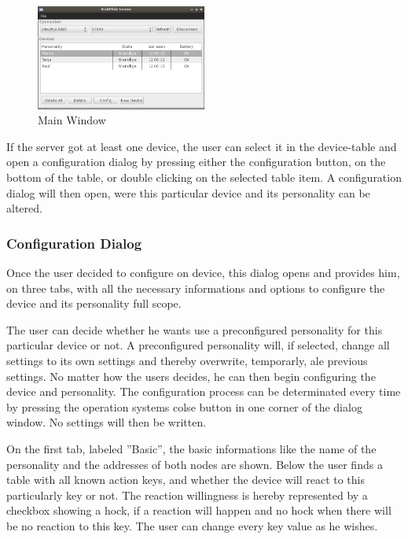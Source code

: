 \begin{figure}[h!]
 \centering
 \includegraphics[width= 0.5\textwidth, clip=true  ,keepaspectratio=true]{./pic/java-server-main.png}
 \caption{Main Window}
 \label{java-server-main}
\end{figure}



If the server got at least one device, the user can select it in the device-table and open a configuration dialog by pressing either the configuration button, on the bottom of the table, or double clicking on the selected table item. A configuration dialog will then open, were this particular device and its personality can be altered.

\subsubsection{Configuration Dialog}
Once the user decided to configure on device, this dialog opens and provides him, on three tabs, with all the necessary informations and options to configure the device and its personality full scope. %

The user can decide whether he wants use a preconfigured personality for this particular device or not. A preconfigured personality will, if selected, change all settings to its own settings and thereby overwrite, temporarly, ale previous settings. No matter how the users decides, he can then begin configuring the device and personality. The configuration process can be determinated every time by pressing the operation systems colse button in one corner of the dialog window. No settings will then be written.

On the first tab, labeled ''Basic'', the basic informations like the name of the personality and the addresses of both nodes are shown. Below the user finds a table with all known action keys, and whether the device will react to this particularly key or not. The reaction willingness is hereby represented by a checkbox showing a hock, if a reaction will happen and no hock when there will be no reaction to this key. The user can change every key value as he wishes.

